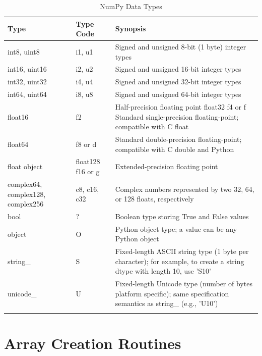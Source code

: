 \documentclass[a4paper,11pt]{book}
\begin{document}
\clearpage

\begin{table}
	\centering
	\caption{NumPy Data Types}
	\label{tab:array_data_types}
	\begin{tabular}{p{7cm}p{4cm}p{10cm}}
		\toprule \toprule
			Type & Type Code & Synopsis \\
			\midrule 
			int8, uint8\dotfill & i1, u1 & Signed and unsigned 8-bit (1 byte) integer types \\ 
			int16, uint16\dotfill & i2, u2 & Signed and unsigned 16-bit integer types \\
			int32, uint32\dotfill & i4, u4 & Signed and unsigned 32-bit integer types \\ 
			int64, uint64\dotfill & i8, u8 & Signed and unsigned 64-bit integer types \\
			float16\dotfill & f2 & Half-precision floating point float32 f4 or f Standard single-precision floating-point; compatible with C float\\ 
			float64\dotfill & f8 or d & Standard double-precision floating-point; compatible with C double and Python\\ 
			float object\dotfill & float128 f16 or g & Extended-precision floating point \\  
			complex64, complex128, complex256\dotfill & c8, c16, c32 & Complex numbers represented by two 32, 64, or 128 floats, respectively  \\ 
			bool\dotfill & ? & Boolean type storing True and False values \\ 
			object\dotfill & O & Python object type; a value can be any Python object \\ 
			string\_\dotfill & S & Fixed-length ASCII string type (1 byte per character); for example, to create a string dtype with length 10, use 'S10' \\ 
			unicode\_\dotfill & U & Fixed-length Unicode type (number of bytes platform specific); same specification semantics as string\_ (e.g., 'U10')	\\
     			\bottomrule \\
	\end{tabular}
\end{table}
\clearpage

\section{Array Creation Routines}
\label{sec:array_creation}
\end{document}

